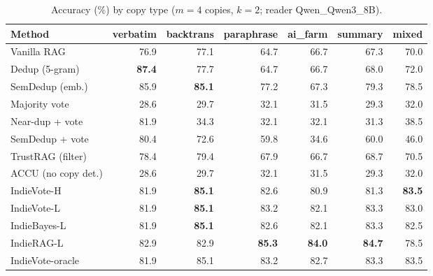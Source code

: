 \begin{table}[tbp]
\centering
\small
\caption{Accuracy (\%) by copy type ($m{=}4$ copies, $k{=}2$; reader Qwen\_Qwen3\_8B).}
\label{tab:types:Qwen_Qwen3_8B}
\setlength{\tabcolsep}{4pt}
\begin{tabular}{lrrrrrr}
\toprule
Method & verbatim & backtrans & paraphrase & ai\_farm & summary & mixed \\
\midrule
Vanilla RAG & 76.9 & 77.1 & 64.7 & 66.7 & 67.3 & 70.0 \\
Dedup (5-gram) & \textbf{87.4} & 77.7 & 64.7 & 66.7 & 68.0 & 72.0 \\
SemDedup (emb.) & 85.9 & \textbf{85.1} & 77.2 & 67.3 & 79.3 & 78.5 \\
Majority vote & 28.6 & 29.7 & 32.1 & 31.5 & 29.3 & 32.0 \\
Near-dup + vote & 81.9 & 34.3 & 32.1 & 32.1 & 31.3 & 38.5 \\
SemDedup + vote & 80.4 & 72.6 & 59.8 & 34.6 & 60.0 & 46.0 \\
TrustRAG (filter) & 78.4 & 79.4 & 67.9 & 66.7 & 68.7 & 70.5 \\
ACCU (no copy det.) & 28.6 & 29.7 & 32.1 & 31.5 & 29.3 & 32.0 \\
IndieVote-H & 81.9 & \textbf{85.1} & 82.6 & 80.9 & 81.3 & \textbf{83.5} \\
IndieVote-L & 81.9 & \textbf{85.1} & 83.2 & 82.1 & 83.3 & 83.0 \\
IndieBayes-L & 81.9 & \textbf{85.1} & 82.6 & 82.1 & 83.3 & 82.5 \\
IndieRAG-L & 82.9 & 82.9 & \textbf{85.3} & \textbf{84.0} & \textbf{84.7} & 78.5 \\
IndieVote-oracle & 81.9 & 85.1 & 83.2 & 82.7 & 83.3 & 83.5 \\
\bottomrule
\end{tabular}
\end{table}
